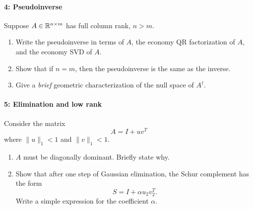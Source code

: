 \documentclass[12pt, leqno]{article}
\begin{document}
\paragraph*{4: Pseudoinverse}
Suppose $A \in \mathbb{R}^{n \times m}$ has full column rank, $n > m$.
\begin{enumerate}
\item
  Write the pseudoinverse in terms of $A$, the economy QR
  factorization of $A$, and the economy SVD of $A$.
\item
  Show that if $n = m$, then the pseudoinverse is the same as the
  inverse.
\item
  Give a {\em brief} geometric characterization of the null space of
  $A^\dagger$.
\end{enumerate}

\paragraph*{5: Elimination and low rank}
Consider the matrix
\[
  A = I + uv^T
\]
where $\|u\|_1 < 1$ and $\|v\|_1 < 1$.
\begin{enumerate}
\item
  $A$ must be diagonally dominant.  Briefly state why.
\item
  Show that after one step of Gaussian elimination,
  the Schur complement has the form
  \[
    S = I + \alpha u_2 v_2^T.
  \]
  Write a simple expression for the coefficient $\alpha$.
\end{enumerate}
\end{document}
